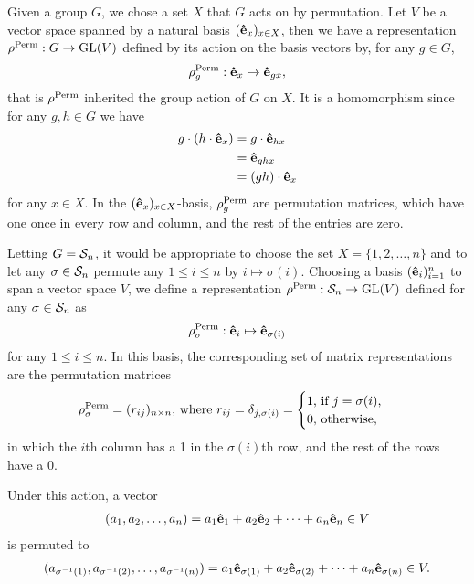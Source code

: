 	Given a group $G$, we chose a set $X$ that $G$ acts on by permutation. Let $V$ be a vector space spanned by a natural basis $(\mathbf{\hat{e}}_x)_{x \in X}$, then we have a representation $\rho^{\text{Perm}} : G \rightarrow \text{GL}(V)$	defined by its action on the basis vectors by, for any $g \in G$, 
	\begin{align*}
		\rho_g^{\text{Perm}} : \mathbf{\hat{e}}_x \mapsto \mathbf{\hat{e}}_{gx},
	\end{align*}
	that is $\rho^{\text{Perm}}$ inherited the group action of $G$ on $X$. It is a homomorphism since for any $g,h \in G$ we have
	{\allowdisplaybreaks\begin{align*}
		g \cdot (h \cdot \mathbf{\hat{e}}_x) &= g \cdot \mathbf{\hat{e}}_{hx} \\
		&= \mathbf{\hat{e}}_{ghx} \\
		&= (gh) \cdot \mathbf{\hat{e}}_x
	\end{align*}}
	for any $x \in X$. %
	In the $(\mathbf{\hat{e}}_x)_{x \in X}$-basis, $\rho_g^{\text{Perm}}$ are permutation matrices, which have one once in every row and column, and the rest of the entries are zero.
	
	Letting $G = \mathcal{S}_n$, it would be appropriate to choose the set $X = \{1, 2, \dots, n\}$ and to let any $\sigma \in \mathcal{S}_n$ permute any $1 \leq i \leq n$ by $i \mapsto \sigma(i)$. Choosing a basis $(\mathbf{\hat{e}}_i)_{i=1}^n$ to span a vector space $V$, we define a representation $\rho^{\text{Perm}}: \mathcal{S}_n \rightarrow \text{GL}(V)$ defined for any $\sigma \in \mathcal{S}_n$ as
	\begin{align*}
		\rho_\sigma^{\text{Perm}}: \mathbf{\hat{e}}_i \mapsto \mathbf{\hat{e}}_{\sigma(i)}
	\end{align*}
	for any $1 \leq i \leq n$. In this basis, the corresponding set of matrix representations are the permutation matrices
	\begin{align*}
		\rho_\sigma^{\text{Perm}} = (r_{ij})_{n \times n} \text{, where } r_{ij} = \delta_{j,\sigma(i)} = \begin{cases}
			1 \text{, if $j = \sigma(i)$,} \\
			0 \text{, otherwise,}
		\end{cases}
	\end{align*}
	in which the $i$th column has a 1 in the $\sigma(i)$th row, and the rest of the rows have a 0.
	
	Under this action, a vector
	\begin{align*}
		(a_1, a_2, \dots, a_n) = a_1 \mathbf{\hat{e}}_1 + a_2 \mathbf{\hat{e}}_2 + \dots + a_n \mathbf{\hat{e}}_n \in V
	\end{align*}
	is permuted to 
	\begin{align*}
		(a_{\sigma^{-1}(1)}, a_{\sigma^{-1}(2)}, \dots, a_{\sigma^{-1}(n)}) = a_1 \mathbf{\hat{e}}_{\sigma(1)} + a_2 \mathbf{\hat{e}}_{\sigma(2)} + \dots + a_n \mathbf{\hat{e}}_{\sigma(n)}  \in V.
	\end{align*}
	

